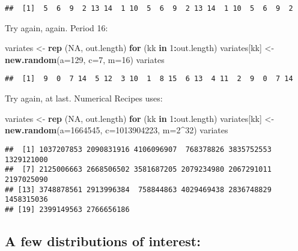 \documentclass[
]{article}
\newenvironment{Shaded}{\begin{snugshade}}{\end{snugshade}}
\newcommand{\AttributeTok}[1]{\textcolor[rgb]{0.13,0.29,0.53}{#1}}
\newcommand{\ConstantTok}[1]{\textcolor[rgb]{0.56,0.35,0.01}{#1}}
\newcommand{\ControlFlowTok}[1]{\textcolor[rgb]{0.13,0.29,0.53}{\textbf{#1}}}
\newcommand{\DecValTok}[1]{\textcolor[rgb]{0.00,0.00,0.81}{#1}}
\newcommand{\FunctionTok}[1]{\textcolor[rgb]{0.13,0.29,0.53}{\textbf{#1}}}
\newcommand{\NormalTok}[1]{#1}
\newcommand{\OtherTok}[1]{\textcolor[rgb]{0.56,0.35,0.01}{#1}}
\newcommand{\SpecialCharTok}[1]{\textcolor[rgb]{0.81,0.36,0.00}{\textbf{#1}}}
\begin{document}
\begin{verbatim}
##  [1]  5  6  9  2 13 14  1 10  5  6  9  2 13 14  1 10  5  6  9  2
\end{verbatim}

Try again, again. Period 16:

\begin{Shaded}
\begin{Highlighting}[]
\NormalTok{variates }\OtherTok{\textless{}{-}} \FunctionTok{rep}\NormalTok{ (}\ConstantTok{NA}\NormalTok{, out.length)}
\ControlFlowTok{for}\NormalTok{ (kk }\ControlFlowTok{in} \DecValTok{1}\SpecialCharTok{:}\NormalTok{out.length) variates[kk] }\OtherTok{\textless{}{-}} \FunctionTok{new.random}\NormalTok{(}\AttributeTok{a=}\DecValTok{129}\NormalTok{, }\AttributeTok{c=}\DecValTok{7}\NormalTok{, }\AttributeTok{m=}\DecValTok{16}\NormalTok{)}
\NormalTok{variates}
\end{Highlighting}
\end{Shaded}

\begin{verbatim}
##  [1]  9  0  7 14  5 12  3 10  1  8 15  6 13  4 11  2  9  0  7 14
\end{verbatim}

Try again, at last. Numerical Recipes uses:

\begin{Shaded}
\begin{Highlighting}[]
\NormalTok{variates }\OtherTok{\textless{}{-}} \FunctionTok{rep}\NormalTok{ (}\ConstantTok{NA}\NormalTok{, out.length)}
\ControlFlowTok{for}\NormalTok{ (kk }\ControlFlowTok{in} \DecValTok{1}\SpecialCharTok{:}\NormalTok{out.length) variates[kk] }\OtherTok{\textless{}{-}} \FunctionTok{new.random}\NormalTok{(}\AttributeTok{a=}\DecValTok{1664545}\NormalTok{, }\AttributeTok{c=}\DecValTok{1013904223}\NormalTok{, }\AttributeTok{m=}\DecValTok{2}\SpecialCharTok{\^{}}\DecValTok{32}\NormalTok{)}
\NormalTok{variates}
\end{Highlighting}
\end{Shaded}

\begin{verbatim}
##  [1] 1037207853 2090831916 4106096907  768378826 3835752553 1329121000
##  [7] 2125006663 2668506502 3581687205 2079234980 2067291011 2197025090
## [13] 3748878561 2913996384  758844863 4029469438 2836748829 1458315036
## [19] 2399149563 2766656186
\end{verbatim}

\subsection{A few distributions of
interest:}\label{a-few-distributions-of-interest}
\end{document}
